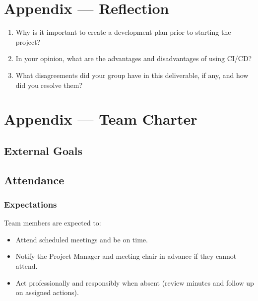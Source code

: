\documentclass{article}
\begin{document}
\newpage{}

\section*{Appendix --- Reflection}




\begin{enumerate}
    \item Why is it important to create a development plan prior to starting the
    project?
    \item In your opinion, what are the advantages and disadvantages of using
    CI/CD?
    \item What disagreements did your group have in this deliverable, if any,
    and how did you resolve them?
\end{enumerate}

\newpage{}

\section*{Appendix --- Team Charter}


\subsection*{External Goals}


\subsection*{Attendance}

\subsubsection*{Expectations}

Team members are expected to: 
\begin{itemize}
  \item Attend scheduled meetings and be on time.
  \item Notify the Project Manager and meeting chair in advance if they cannot attend.
  \item Act professionally and responsibly when absent (review minutes and follow up on assigned actions).
\end{itemize}
\end{document}
